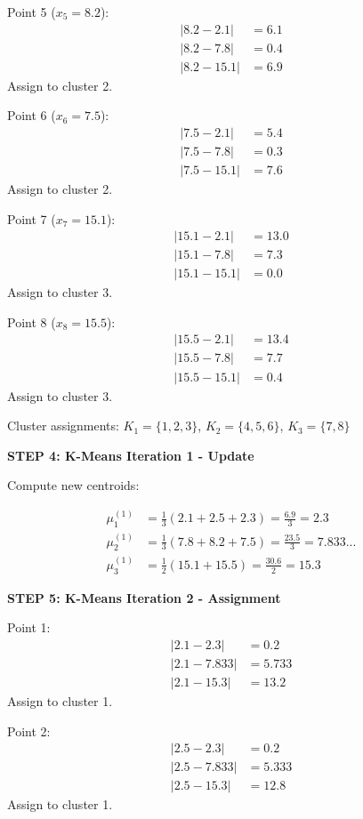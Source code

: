 \documentclass[12pt]{article}
\begin{document}
\begin{solution}
Point 5 ($x_5 = 8.2$):
\begin{align*}
|8.2 - 2.1| &= 6.1 \\
|8.2 - 7.8| &= 0.4 \\
|8.2 - 15.1| &= 6.9
\end{align*}
Assign to cluster 2.

Point 6 ($x_6 = 7.5$):
\begin{align*}
|7.5 - 2.1| &= 5.4 \\
|7.5 - 7.8| &= 0.3 \\
|7.5 - 15.1| &= 7.6
\end{align*}
Assign to cluster 2.

Point 7 ($x_7 = 15.1$):
\begin{align*}
|15.1 - 2.1| &= 13.0 \\
|15.1 - 7.8| &= 7.3 \\
|15.1 - 15.1| &= 0.0
\end{align*}
Assign to cluster 3.

Point 8 ($x_8 = 15.5$):
\begin{align*}
|15.5 - 2.1| &= 13.4 \\
|15.5 - 7.8| &= 7.7 \\
|15.5 - 15.1| &= 0.4
\end{align*}
Assign to cluster 3.

Cluster assignments: $K_1 = \{1,2,3\}$, $K_2 = \{4,5,6\}$, $K_3 = \{7,8\}$

\textbf{STEP 4: K-Means Iteration 1 - Update}

Compute new centroids:

\begin{align*}
\mu_1^{(1)} &= \frac{1}{3}(2.1 + 2.5 + 2.3) = \frac{6.9}{3} = 2.3 \\
\mu_2^{(1)} &= \frac{1}{3}(7.8 + 8.2 + 7.5) = \frac{23.5}{3} = 7.833... \\
\mu_3^{(1)} &= \frac{1}{2}(15.1 + 15.5) = \frac{30.6}{2} = 15.3
\end{align*}

\textbf{STEP 5: K-Means Iteration 2 - Assignment}

Point 1:
\begin{align*}
|2.1 - 2.3| &= 0.2 \\
|2.1 - 7.833| &= 5.733 \\
|2.1 - 15.3| &= 13.2
\end{align*}
Assign to cluster 1.

Point 2:
\begin{align*}
|2.5 - 2.3| &= 0.2 \\
|2.5 - 7.833| &= 5.333 \\
|2.5 - 15.3| &= 12.8
\end{align*}
Assign to cluster 1.


\end{solution}
\end{document}
